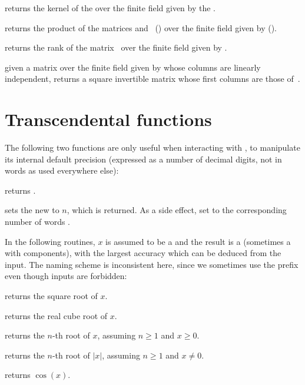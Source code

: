  returns the kernel of the 
 over the finite field given by the  .

 returns the product of the
matrices  and~ () over the finite field given
by  ().

 returns the rank of the
matrix~ over the finite field given by .

 given a matrix  over the
finite field given by  whose columns are linearly independent,
returns a square invertible matrix whose first columns are those
of~.

\section{Transcendental functions}

The following two functions are only useful when interacting with ,
to manipulate its internal default precision (expressed as a number of
decimal digits, not in words as used everywhere else):

 returns .

 sets the new
 to $n$, which is returned. As a side effect, set
 to the corresponding number of words .


In the following routines, $x$ is assumed to be a  and the result
is a  (sometimes a  with  components), with
the largest accuracy which can be deduced from the input. The naming scheme
is inconsistent here, since we sometimes use the prefix  even though
 inputs are forbidden:

 returns the square root of $x$.

 returns the real cube root of $x$.

 returns the $n$-th root of $x$, assuming
$n\geq 1$ and $x \geq 0$.

 returns the $n$-th root of $|x|$,
assuming $n\geq 1$ and $x \neq 0$.

 returns $\cos(x)$.

